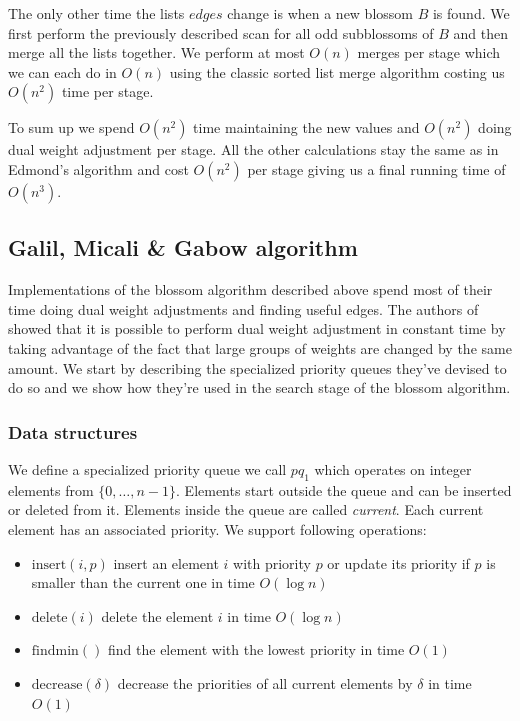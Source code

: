 The only other time the lists $edges$ change is when a new blossom $B$ is found. We first perform the previously described scan for all odd subblossoms of $B$ and then merge all the lists together. We perform at most $O(n)$ merges per stage which we can each do in $O(n)$ using the classic sorted list merge algorithm costing us $O(n^2)$ time per stage.

To sum up we spend $O(n^2)$ time maintaining the new values and $O(n^2)$ doing dual weight adjustment per stage. All the other calculations stay the same as in Edmond's algorithm and cost $O(n^2)$ per stage giving us a final running time of $O(n^3)$.

\subsection{Galil, Micali \& Gabow algorithm}

Implementations of the blossom algorithm described above spend most of their time doing dual weight adjustments and finding useful edges. The authors of~\cite{micali1980v} showed that it is possible to perform dual weight adjustment in constant time by taking advantage of the fact that large groups of weights are changed by the same amount. We start by describing the specialized priority queues they've devised to do so and we show how they're used in the search stage of the blossom algorithm.

\subsubsection{Data structures}

We define a specialized priority queue we call $pq_1$ which operates on integer elements from $\{0, \dots, n-1\}$. Elements start outside the queue and can be inserted or deleted from it. Elements inside the queue are called \textit{current}. Each current element has an associated priority. We support following operations:

\begin{itemize}
    \item $\text{insert}(i, p)$ insert an element $i$ with priority $p$ or update its priority if $p$ is smaller than the current one in time $O(\log n)$
    \item $\text{delete}(i)$ delete the element $i$ in time $O(\log n)$
    \item $\text{findmin}()$ find the element with the lowest priority in time $O(1)$
    \item $\text{decrease}(\delta)$ decrease the priorities of all current elements by $\delta$ in time $O(1)$
\end{itemize}

